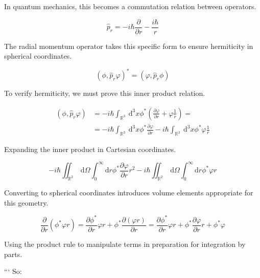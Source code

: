 \documentclass[10pt]{article}
\begin{document}
In quantum mechanics, this becomes a commutation relation between operators.

\begin{equation*}
\hat{p}_{r}=-i \hbar \frac{\partial}{\partial r}-\frac{i \hbar}{r} \tag{9.16}
\end{equation*}

The radial momentum operator takes this specific form to ensure hermiticity in spherical coordinates.

\begin{equation*}
\left(\phi, \hat{p}_{r} \varphi\right)^{*}=\left(\varphi, \hat{p}_{r} \phi\right) \tag{9.17}
\end{equation*}

To verify hermiticity, we must prove this inner product relation.

\begin{align*}
\left(\phi, \hat{p}_{r} \varphi\right) & =-i \hbar \int_{\mathbb{R}^{3}} \mathrm{~d}^{3} x \phi^{*}\left(\frac{\partial \varphi}{\partial r}+\varphi \frac{1}{r}\right)=  \tag{9.18}\\
& =-i \hbar \int_{\mathbb{R}^{3}} \mathrm{~d}^{3} x \phi^{*} \frac{\partial \varphi}{\partial r}-i \hbar \int_{\mathbb{R}^{3}} \mathrm{~d}^{3} x \phi^{*} \varphi \frac{1}{r}
\end{align*}

Expanding the inner product in Cartesian coordinates.

\begin{equation*}
-i \hbar \iint_{\mathbb{R}^{2}} \mathrm{~d} \Omega \int_{0}^{\infty} \mathrm{d} r \phi^{*} \frac{\partial \varphi}{\partial r} r^{2}-i \hbar \iint_{\mathbb{R}^{2}} \mathrm{~d} \Omega \int_{0}^{\infty} \mathrm{d} r \phi^{*} \varphi r \tag{9.19}
\end{equation*}

Converting to spherical coordinates introduces volume elements appropriate for this geometry.

\begin{equation*}
\frac{\partial}{\partial r}\left(\phi^{*} \varphi r\right)=\frac{\partial \phi^{*}}{\partial r} \varphi r+\phi^{*} \frac{\partial(\varphi r)}{\partial r}=\frac{\partial \phi^{*}}{\partial r} \varphi r+\phi^{*} \frac{\partial \varphi}{\partial r} r+\phi^{*} \varphi \tag{9.20}
\end{equation*}

Using the product rule to manipulate terms in preparation for integration by parts.

```
So:
\end{document}
